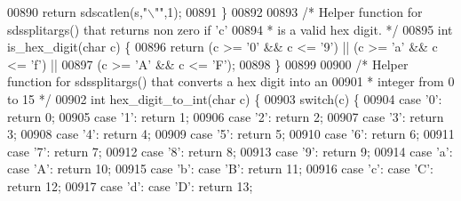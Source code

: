 \begin{DoxyCode}
{{{{{{{{{{{{{{{{00890     \textcolor{keywordflow}{return} sdscatlen(s,\textcolor{stringliteral}{"\(\backslash\)""},1);
00891 \}
00892 
00893 \textcolor{comment}{/* Helper function for sdssplitargs() that returns non zero if 'c'}
00894 \textcolor{comment}{ * is a valid hex digit. */}
00895 \textcolor{keywordtype}{int} is\_hex\_digit(\textcolor{keywordtype}{char} c) \{
00896     \textcolor{keywordflow}{return} (c >= \textcolor{stringliteral}{'0'} && c <= \textcolor{stringliteral}{'9'}) || (c >= \textcolor{stringliteral}{'a'} && c <= \textcolor{stringliteral}{'f'}) ||
00897            (c >= \textcolor{stringliteral}{'A'} && c <= \textcolor{stringliteral}{'F'});
00898 \}
00899 
00900 \textcolor{comment}{/* Helper function for sdssplitargs() that converts a hex digit into an}
00901 \textcolor{comment}{ * integer from 0 to 15 */}
00902 \textcolor{keywordtype}{int} hex\_digit\_to\_int(\textcolor{keywordtype}{char} c) \{
00903     \textcolor{keywordflow}{switch}(c) \{
00904     \textcolor{keywordflow}{case} \textcolor{stringliteral}{'0'}: \textcolor{keywordflow}{return} 0;
00905     \textcolor{keywordflow}{case} \textcolor{stringliteral}{'1'}: \textcolor{keywordflow}{return} 1;
00906     \textcolor{keywordflow}{case} \textcolor{stringliteral}{'2'}: \textcolor{keywordflow}{return} 2;
00907     \textcolor{keywordflow}{case} \textcolor{stringliteral}{'3'}: \textcolor{keywordflow}{return} 3;
00908     \textcolor{keywordflow}{case} \textcolor{stringliteral}{'4'}: \textcolor{keywordflow}{return} 4;
00909     \textcolor{keywordflow}{case} \textcolor{stringliteral}{'5'}: \textcolor{keywordflow}{return} 5;
00910     \textcolor{keywordflow}{case} \textcolor{stringliteral}{'6'}: \textcolor{keywordflow}{return} 6;
00911     \textcolor{keywordflow}{case} \textcolor{stringliteral}{'7'}: \textcolor{keywordflow}{return} 7;
00912     \textcolor{keywordflow}{case} \textcolor{stringliteral}{'8'}: \textcolor{keywordflow}{return} 8;
00913     \textcolor{keywordflow}{case} \textcolor{stringliteral}{'9'}: \textcolor{keywordflow}{return} 9;
00914     \textcolor{keywordflow}{case} \textcolor{stringliteral}{'a'}: \textcolor{keywordflow}{case} \textcolor{stringliteral}{'A'}: \textcolor{keywordflow}{return} 10;
00915     \textcolor{keywordflow}{case} \textcolor{stringliteral}{'b'}: \textcolor{keywordflow}{case} \textcolor{stringliteral}{'B'}: \textcolor{keywordflow}{return} 11;
00916     \textcolor{keywordflow}{case} \textcolor{stringliteral}{'c'}: \textcolor{keywordflow}{case} \textcolor{stringliteral}{'C'}: \textcolor{keywordflow}{return} 12;
00917     \textcolor{keywordflow}{case} \textcolor{stringliteral}{'d'}: \textcolor{keywordflow}{case} \textcolor{stringliteral}{'D'}: \textcolor{keywordflow}{return} 13;
}}}}}}}}}}}}}}}}
\end{DoxyCode}
